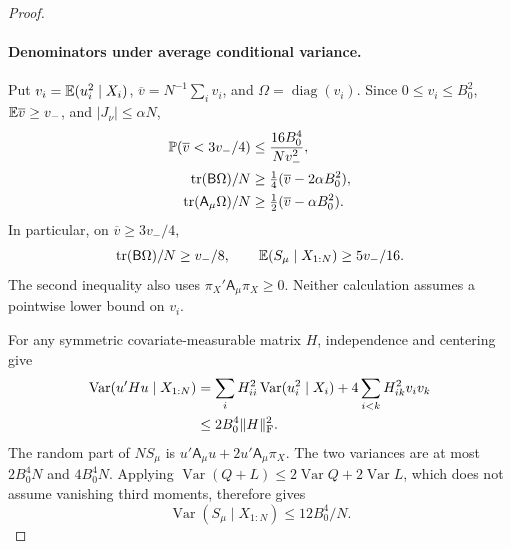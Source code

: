 \begin{proof}
\paragraph{Denominators under average conditional variance.}
Put $v_i=\mathbb E(u_i^2\mid X_i)$,
$\overline v=N^{-1}\sum_i v_i$, and
$\Omega=\operatorname{diag}(v_i)$. Since $0\le v_i\le B_0^2$,
$\mathbb E\overline v\ge v_-$, and $|J_\nu|\le\alpha N$,
\begin{align}
 \mathbb P(\overline v<3v_-/4)&\le\frac{16B_0^4}{Nv_-^2},
 \label{eq:adaptation-average-variance}\\
 \operatorname{tr}(\mathsf B\Omega)/N
 &\ge\tfrac14(\overline v-2\alpha B_0^2),\nonumber\\
 \operatorname{tr}(\mathsf A_\mu\Omega)/N
 &\ge\tfrac12(\overline v-\alpha B_0^2).
 \label{eq:adaptation-trimmed-traces}
\end{align}
In particular, on $\overline v\ge3v_-/4$,
\begin{equation}
 \operatorname{tr}(\mathsf B\Omega)/N\ge v_-/8,\qquad
 \mathbb E(S_\mu\mid X_{1:N})\ge5v_-/16.
 \label{eq:adaptation-denominator-means}
\end{equation}
The second inequality also uses
$\pi_X'\mathsf A_\mu\pi_X\ge0$. Neither calculation assumes a
pointwise lower bound on $v_i$.

For any symmetric covariate-measurable matrix $H$, independence and
centering give
\begin{align*}
 \operatorname{Var}(u'Hu\mid X_{1:N})
 &=\sum_iH_{ii}^2\operatorname{Var}(u_i^2\mid X_i)
       +4\sum_{i<k}H_{ik}^2v_iv_k\\
 &\le2B_0^4\|H\|_{\rm F}^2.
\end{align*}
The random part of $NS_\mu$ is
$u'\mathsf A_\mu u+2u'\mathsf A_\mu\pi_X$. The two variances are at
most $2B_0^4N$ and $4B_0^4N$. Applying
$\operatorname{Var}(Q+L)\le2\operatorname{Var}Q+
2\operatorname{Var}L$, which does not assume vanishing third moments,
therefore gives
\begin{equation}
 \operatorname{Var}(S_\mu\mid X_{1:N})\le12B_0^4/N.
 \label{eq:adaptation-denominator}
\end{equation}


\end{proof}
